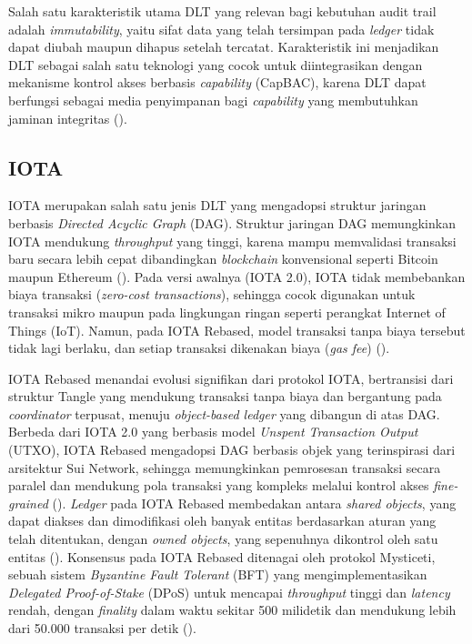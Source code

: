 Salah satu karakteristik utama DLT yang relevan bagi kebutuhan audit trail adalah \textit{immutability}, yaitu sifat data yang telah tersimpan pada \textit{ledger} tidak dapat diubah maupun dihapus setelah tercatat. Karakteristik ini menjadikan DLT sebagai salah satu teknologi yang cocok untuk diintegrasikan dengan mekanisme kontrol akses berbasis \textit{capability} (CapBAC), karena DLT dapat berfungsi sebagai media penyimpanan bagi \textit{capability} yang membutuhkan jaminan integritas (\cite{DecMed}).

\subsection{IOTA}
\label{subsec:iota}

IOTA merupakan salah satu jenis DLT yang mengadopsi struktur jaringan berbasis \textit{Directed Acyclic Graph} (DAG). Struktur jaringan DAG memungkinkan IOTA mendukung \textit{throughput} yang tinggi, karena mampu memvalidasi transaksi baru secara lebih cepat dibandingkan \textit{blockchain} konvensional seperti Bitcoin maupun Ethereum (\cite{DecMed}). Pada versi awalnya (IOTA 2.0), IOTA tidak membebankan biaya transaksi (\textit{zero-cost transactions}), sehingga cocok digunakan untuk transaksi mikro maupun pada lingkungan ringan seperti perangkat Internet of Things (IoT). Namun, pada IOTA Rebased, model transaksi tanpa biaya tersebut tidak lagi berlaku, dan setiap transaksi dikenakan biaya (\textit{gas fee}) (\cite{DecMed}).

IOTA Rebased menandai evolusi signifikan dari protokol IOTA, bertransisi dari struktur Tangle yang mendukung transaksi tanpa biaya dan bergantung pada \textit{coordinator} terpusat, menuju \textit{object-based ledger} yang dibangun di atas DAG. Berbeda dari IOTA 2.0 yang berbasis model \textit{Unspent Transaction Output} (UTXO), IOTA Rebased mengadopsi DAG berbasis objek yang terinspirasi dari arsitektur Sui Network, sehingga memungkinkan pemrosesan transaksi secara paralel dan mendukung pola transaksi yang kompleks melalui kontrol akses \textit{fine-grained} (\cite{DecMed}). \textit{Ledger} pada IOTA Rebased membedakan antara \textit{shared objects}, yang dapat diakses dan dimodifikasi oleh banyak entitas berdasarkan aturan yang telah ditentukan, dengan \textit{owned objects}, yang sepenuhnya dikontrol oleh satu entitas (\cite{DecMed}). Konsensus pada IOTA Rebased ditenagai oleh protokol Mysticeti, sebuah sistem \textit{Byzantine Fault Tolerant} (BFT) yang mengimplementasikan \textit{Delegated Proof-of-Stake} (DPoS) untuk mencapai \textit{throughput} tinggi dan \textit{latency} rendah, dengan \textit{finality} dalam waktu sekitar 500 milidetik dan mendukung lebih dari 50.000 transaksi per detik (\cite{DecMed}).

